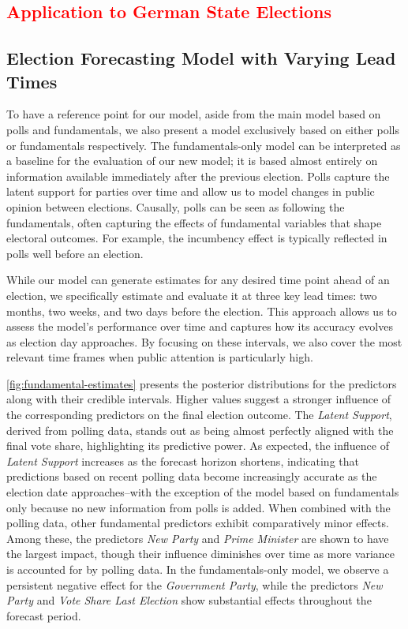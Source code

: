 \documentclass[12pt]{article}
\begin{document}
\begin{doublespacing}
\FloatBarrier

\section{\textcolor{red}{Application to German State Elections}}

\subsection{Election Forecasting Model with Varying Lead Times}

To have a reference point for our model, aside from the main model based on polls and fundamentals, we also present a model exclusively based on either polls or fundamentals respectively. The fundamentals-only model can be interpreted as a baseline for the evaluation of our new model; it is based almost entirely on information available immediately after the previous election. Polls capture the latent support for parties over time and allow us to model changes in public opinion between elections. Causally, polls can be seen as following the fundamentals, often capturing the effects of fundamental variables that shape electoral outcomes. For example, the incumbency effect is typically reflected in polls well before an election. 

While our model can generate estimates for any desired time point ahead of an election, we specifically estimate and evaluate it at three key lead times: two months, two weeks, and two days before the election. This approach allows us to assess the model’s performance over time and captures how its accuracy evolves as  election day approaches. By focusing on these intervals, we also cover the most relevant time frames when public attention is particularly high.

\autoref{fig:fundamental-estimates} presents the posterior distributions for the predictors along with their credible intervals. Higher values suggest a stronger influence of the corresponding predictors on the final election outcome.
The \textit{Latent Support}, derived from polling data, stands out as being almost perfectly aligned with the final vote share, highlighting its predictive power. As expected, the influence of \textit{Latent Support} increases as the forecast horizon shortens, indicating that predictions based on recent polling data become increasingly accurate as the election date approaches--with the exception of the model based on fundamentals only because no new information from polls is added.
When combined with the polling data, other fundamental predictors exhibit comparatively minor effects. Among these, the predictors \textit{New Party} and \textit{Prime Minister} are shown to have the largest impact, though their influence diminishes over time as more variance is accounted for by polling data.
In the fundamentals-only model, we observe a persistent negative effect for the \textit{Government Party}, while the predictors \textit{New Party} and \textit{Vote Share Last Election} show substantial effects throughout the forecast period.


\end{doublespacing}
\end{document}
